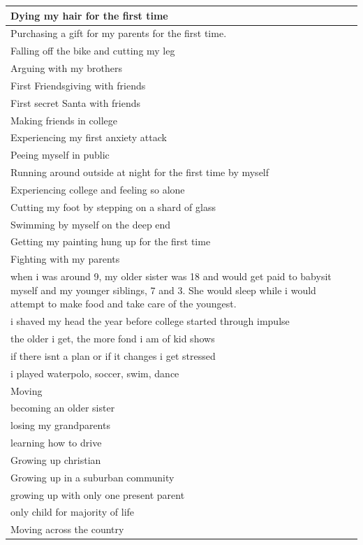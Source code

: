 \documentclass[
  .7em,
  letterpaper,
  DIV=11,
  numbers=noendperiod]{scrartcl}
\begin{document}
\begin{table}
\begin{tabular}{l}
\hline
Dying my hair for the first time\\
\hline
Purchasing a gift for my parents for the first time.\\
\hline
Falling off the bike and cutting my leg\\
\hline
Arguing with my brothers\\
\hline
First Friendsgiving with friends\\
\hline
First secret Santa with friends\\
\hline
Making friends in college\\
\hline
Experiencing my first anxiety attack\\
\hline
Peeing myself in public\\
\hline
Running around outside at night for the first time by myself\\
\hline
Experiencing college and feeling so alone\\
\hline
Cutting my foot by stepping on a shard of glass\\
\hline
Swimming by myself on the deep end\\
\hline
Getting my painting hung up for the first time\\
\hline
Fighting with my parents\\
\hline
when i was around 9, my older sister was 18 and would get paid to babysit myself and my younger siblings, 7 and 3. She would sleep while i would attempt to make food and take care of the youngest.\\
\hline
i shaved my head the year before college started through impulse\\
\hline
the older i get, the more fond i am of kid shows\\
\hline
if there isnt a plan or if it changes i get stressed\\
\hline
i played waterpolo, soccer, swim, dance\\
\hline
Moving\\
\hline
becoming an older sister\\
\hline
losing my grandparents\\
\hline
learning how to drive\\
\hline
Growing up christian\\
\hline
Growing up in a suburban community\\
\hline
growing up with only one present parent\\
\hline
only child for majority of life\\
\hline
Moving across the country\\

\end{tabular}
\end{table}
\end{document}
